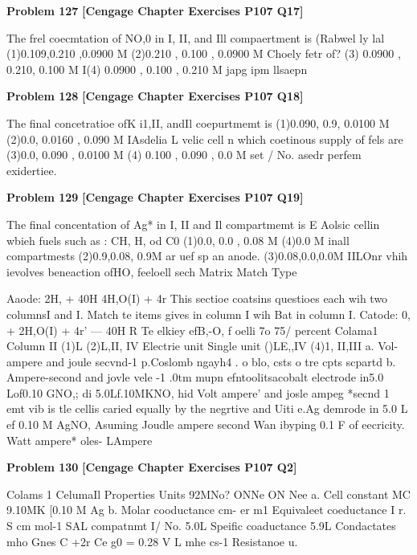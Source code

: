 \begin{problembox}
\textbf{Problem 127} \hfill \textbf{[Cengage Chapter Exercises P107 Q17]}
\label{q:ext-cng-th-127}

The frel coecmtation of NO,0 in I, II, and Ill compaertment is
(Rabwel ly lal
(1)0.109,0.210 ,0.0900 M
(2)0.210 , 0.100 , 0.0900 M
Choely fetr of?
(3) 0.0900 , 0.210, 0.100 M
I(4) 0.0900 , 0.100 , 0.210 M
japg ipm
llsaepn
\end{problembox}

\begin{problembox}
\textbf{Problem 128} \hfill \textbf{[Cengage Chapter Exercises P107 Q18]}
\label{q:ext-cng-th-128}

The final concetratioe ofK i1,II, andIl coepurtmemt is
(1)0.090, 0.9, 0.0100 M
(2)0.0, 0.0160 , 0.090 M
IAsdelia
L  velic cell n which coetinous supply of fels are
(3)0.0, 0.090 , 0.0100 M
(4) 0.100 , 0.090 , 0.0 M
set / No.  asedr  perfem exidertiee.
\end{problembox}

\begin{problembox}
\textbf{Problem 129} \hfill \textbf{[Cengage Chapter Exercises P107 Q19]}
\label{q:ext-cng-th-129}

The final concentation of Ag* in I, II and Il compartmemt is
E Aolsic cellin wbieh fuels such as : CH, H, od C0
(1)0.0, 0.0 , 0.08 M
(4)0.0 M inall compartmests
(2)0.9,0.08, 0.9M
ar uef sp an anode.
(3)0.08,0.0,0.0M
IILOnr vhih ievolves beneaction ofHO, feeloell sech
Matrix Match Type

Aaode: 2H, + 40H   4H,O(I) + 4r
This sectioe coatsins questioes each wih two columnsI and I.
Match te items gives in column I wih Bat in column I.
Catode: 0, + 2H,O(I) + 4r' ---  40H
R Te elkiey efB,-O, f oelli 7o 75/ percent 
Colama1
Column II
(1)L
(2)L,II, IV
Electrie unit
Single unit
()LE,,IV
(4)1, II,III
a. Vol-ampere and
joule secvnd-1
p.Coslomb
ngayh4
. o blo, csts o tre cpts scpartd
b. Ampere-second and
jovle vele -1
.0tm
mupn efntoolitsacobalt electrode in5.0 Lof0.10
GNO,; di 5.0Lf.10MKNO, hid
Volt ampere' and
josle ampeg *secnd 1
emt vib is tle cellis caried equally by the negrtive and
Uiti e.Ag demrode in 5.0 L ef 0.10 M AgNO, Asuming
Joudle ampere second
Wan
ibyping 0.1 F of eecricity.
Watt ampere* oles-
LAmpere
\end{problembox}

\begin{problembox}
\textbf{Problem 130} \hfill \textbf{[Cengage Chapter Exercises P107 Q2]}
\label{q:ext-cng-th-130}

Colams 1
CelumaIl
Properties
Units
92MNo?
ONNe  ON Nee
a. Cell constant
MC
9.10MK
[0.10 M Ag
b. Molar cooductance
cm- er m1
Equivaleet coeductance
I
r. S cm mol-1
SAL
compatnmt
I/ No. 
5.0L
Speific coaductance
5.9L
Condactates
mho
Gnes C +2r   Ce
g0 = 0.28 V
L
mhe cs-1
Resistanoe
u.
\end{problembox}

